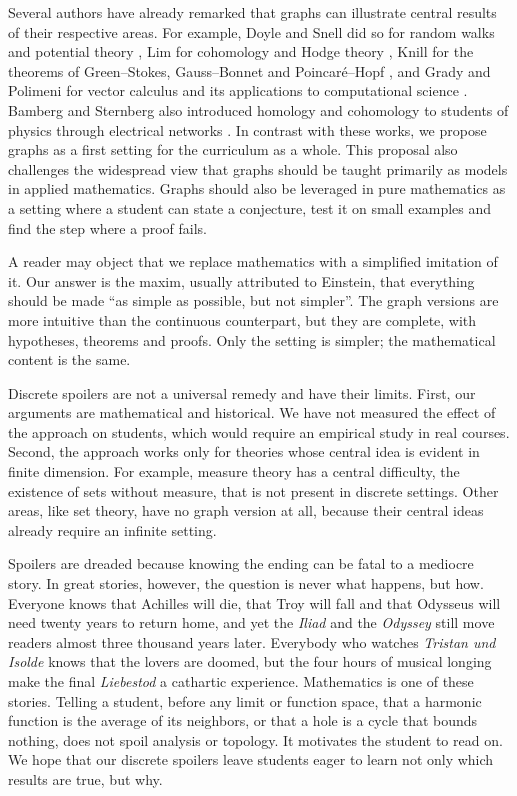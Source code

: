 \documentclass[11pt,a4paper]{article}
\theoremstyle{plain}
\theoremstyle{definition}
\begin{document}
Several authors have already remarked that graphs can illustrate central results of their respective areas. For example, Doyle and Snell did so for random walks and potential theory \cite{doyle1984}, Lim for cohomology and Hodge theory \cite{lim2020}, Knill for the theorems of Green--Stokes, Gauss--Bonnet and Poincar\'e--Hopf \cite{knill2012}, and Grady and Polimeni for vector calculus and its applications to computational science \cite{grady2010}. Bamberg and Sternberg also introduced homology and cohomology to students of physics through electrical networks \cite{bamberg1990}. In contrast with these works, we propose graphs as a first setting for the curriculum as a whole. This proposal also challenges the widespread view that graphs should be taught primarily as models in applied mathematics. Graphs should also be leveraged in pure mathematics as a setting where a student can state a conjecture, test it on small examples and find the step where a proof fails.

A reader may object that we replace mathematics with a simplified imitation of it. Our answer is the maxim, usually attributed to Einstein, that everything should be made ``as simple as possible, but not simpler''. The graph versions are more intuitive than the continuous counterpart, but they are complete, with hypotheses, theorems and proofs. Only the setting is simpler; the mathematical content is the same.

Discrete spoilers are not a universal remedy and have their limits. First, our arguments are mathematical and historical. We have not measured the effect of the approach on students, which would require an empirical study in real courses. Second, the approach works only for theories whose central idea is evident in finite dimension. For example, measure theory has a central difficulty, the existence of sets without measure, that is not present in discrete settings. Other areas, like set theory, have no graph version at all, because their central ideas already require an infinite setting.

Spoilers are dreaded because knowing the ending can be fatal to a mediocre story. In great stories, however, the question is never what happens, but how. Everyone knows that Achilles will die, that Troy will fall and that Odysseus will need twenty years to return home, and yet the \emph{Iliad} and the \emph{Odyssey} still move readers almost three thousand years later. Everybody who watches \emph{Tristan und Isolde} knows that the lovers are doomed, but the four hours of musical longing make the final \emph{Liebestod} a cathartic experience. Mathematics is one of these stories. Telling a student, before any limit or function space, that a harmonic function is the average of its neighbors, or that a hole is a cycle that bounds nothing, does not spoil analysis or topology. It motivates the student to read on. We hope that our discrete spoilers leave students eager to learn not only which results are true, but why.
\end{document}
